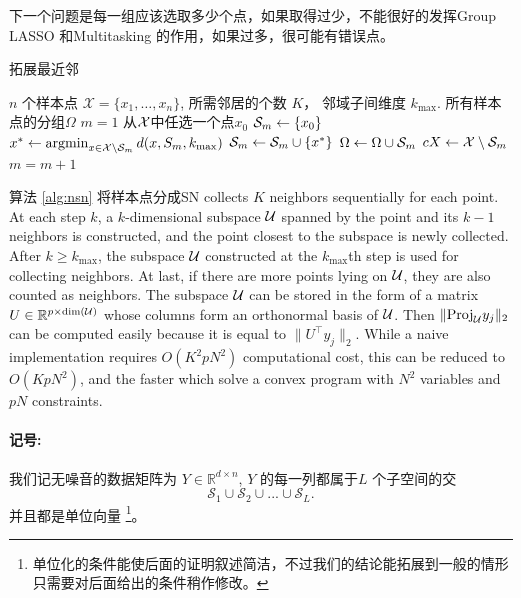\documentclass[main]{subfiles}
\begin{document}
下一个问题是每一组应该选取多少个点，如果取得过少，不能很好的发挥Group LASSO
和Multitasking 的作用，如果过多，很可能有错误点。

\begin{algorithm} \caption{拓展最近邻}
  \begin{algorithmic} \label{alg:nsn}
    \Require $n$ 个样本点 $\mathcal{X} = \{x_1,\ldots,x_n\}$, 所需邻居的个数
    $K$， 邻域子间维度 $k_{\max}$.
    \Ensure 所有样本点的分组$\Omega$
    \State $m=1$
    \Repeat
      \State 从$\mathcal{X}$中任选一个点$x_0$
      \State $\mathcal{S}_m \gets \{x_0\}$ 
       
        \State $x^* \gets \operatorname*{argmin}_{x \in \mathcal{X}  \setminus \mathcal{S}_m} d(x, S_m,
        k_{\max})$
        \State $\mathcal{S}_m \gets \mathcal{S}_m \cup \{x^*\}$
      \EndFor
      \State $\Omega \gets \Omega \cup \mathcal{S}_m$
      \State $cX \gets \mathcal{X} \setminus \mathcal{S}_m$
      \State $m=m+1$
  \end{algorithmic}
\end{algorithm}

算法 \ref{alg:nsn} 将样本点分成SN collects $K$ neighbors sequentially for each point. At each step $k$, a
$k$-dimensional subspace $\mathcal{U}$ spanned by the point and its $k-1$ neighbors
is constructed, and the point closest to the subspace is newly collected. After
$k \ge k_{\max}$, the subspace $\mathcal{U}$ constructed at the $k_{\max}$th step
is used for collecting neighbors. At last, if there are more points lying on
$\mathcal{U}$, they are also counted as neighbors. The subspace $\mathcal{U}$ can be
stored in the form of a matrix $U \in \mathbb{R}^{p \times
  \text{dim}(\mathcal{U})}$ whose columns form an orthonormal basis of $\mathcal{U}$.
  Then $\|\mathrm{Proj}_{\mathcal{U}} y_j\|_2$ can be computed easily because it is equal
  to $\|U^\top y_j\|_2$. While a naive implementation requires $O(K^2pN^2)$
  computational cost, this can be reduced to $O(KpN^2)$, and the faster
  which solve a convex program with $N^2$ variables and $pN$ constraints.

\paragraph{记号: }
我们记无噪音的数据矩阵为 $Y \in \mathbb{R}^{d\times n}$,  $Y$ 的每一列都属于$L$
个子空间的交
$$\mathcal{S}_1 \cup \mathcal{S}_2 \cup...\cup \mathcal{S}_L.$$
并且都是单位向量
\footnote{单位化的条件能使后面的证明叙述简洁，不过我们的结论能拓展到一般的情形只需要对后面给出的条件稍作修改。}。
\end{document}
